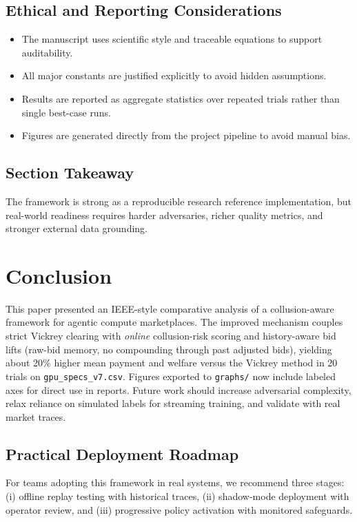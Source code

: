 \documentclass[journal]{IEEEtran}
\begin{document}
\subsection{Ethical and Reporting Considerations}
\begin{itemize}[leftmargin=*]
    \item The manuscript uses scientific style and traceable equations to support auditability.
    \item All major constants are justified explicitly to avoid hidden assumptions.
    \item Results are reported as aggregate statistics over repeated trials rather than single best-case runs.
    \item Figures are generated directly from the project pipeline to avoid manual bias.
\end{itemize}

\subsection{Section Takeaway}
The framework is strong as a reproducible research reference implementation, but real-world readiness requires harder adversaries, richer quality metrics, and stronger external data grounding.

\section{Conclusion}
This paper presented an IEEE-style comparative analysis of a collusion-aware framework for agentic compute marketplaces. The improved mechanism couples strict Vickrey clearing with \emph{online} collusion-risk scoring and history-aware bid lifts (raw-bid memory, no compounding through past adjusted bids), yielding about 20\% higher mean payment and welfare versus the Vickrey method in 20 trials on \texttt{gpu\_specs\_v7.csv}. Figures exported to \texttt{graphs/} now include labeled axes for direct use in reports. Future work should increase adversarial complexity, relax reliance on simulated labels for streaming training, and validate with real market traces.

\subsection{Practical Deployment Roadmap}
For teams adopting this framework in real systems, we recommend three stages: (i) offline replay testing with historical traces, (ii) shadow-mode deployment with operator review, and (iii) progressive policy activation with monitored safeguards.
\end{document}
